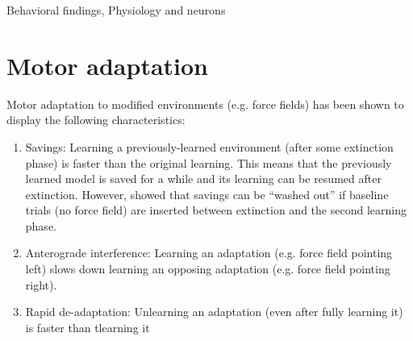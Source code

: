 \documentclass{report}
\begin{document}
\begin{chapter}{Behavioral findings, Physiology and neurons}
\section{Motor adaptation}
Motor adaptation to modified environments (e.g. force fields) has been shown to
display the following characteristics:
\begin{enumerate}
\item Savings: Learning a previously-learned environment (after some extinction
phase) is faster than the original learning. This means that the previously
learned model is saved for a while and its learning can be resumed after
extinction. However, \cite{Kojima_Memory_2004} showed that savings can be
``washed out'' if baseline trials (no force field) are inserted between
extinction and the second learning phase.
\item Anterograde interference: Learning an adaptation (e.g. force field
pointing left) slows down learning an opposing adaptation (e.g. force field
pointing right).
\item Rapid de-adaptation: Unlearning an adaptation (even after fully learning
it) is faster than tlearning it \citep{Davidson_Scaling_2004}
\end{enumerate}

\end{chapter}

\end{document}
